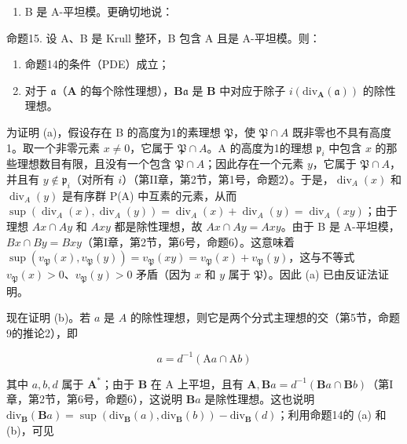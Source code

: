 \begin{enumerate}
\def\labelenumi{(\arabic{enumi})}
\setcounter{enumi}{1}
\tightlist
\item
  B 是 A-平坦模。更确切地说：
\end{enumerate}

命题15. 设 A、B 是 Krull 整环，B 包含 A 且是 A-平坦模。则：

\begin{enumerate}
\def\labelenumi{(\alph{enumi})}
\item
  命题14的条件（PDE）成立；
\item
  对于 \(\mathfrak{a}\)（\(\mathbf{A}\) 的每个除性理想），\(\mathbf{B}\mathfrak{a}\) 是 \(\mathbf{B}\) 中对应于除子 \(i(\mathrm{div}_{\mathbf{A}}(\mathfrak{a}))\) 的除性理想。
\end{enumerate}

为证明 (a)，假设存在 B 的高度为1的素理想 \(\mathfrak{P}\)，使 \(\mathfrak{P} \cap A\) 既非零也不具有高度1。取一个非零元素 \(x \neq 0\)，它属于 \(\mathfrak{P} \cap A\)。A 的高度为1的理想 \(\mathfrak{p}_i\) 中包含 \(x\) 的那些理想数目有限，且没有一个包含 \(\mathfrak{P} \cap A\)；因此存在一个元素 \(y\)，它属于 \(\mathfrak{P} \cap A\)，并且有 \(y \notin \mathfrak{p}_i\)（对所有 \(i\)）（第II章，第2节，第1号，命题2）。于是，\(\operatorname{div}_{A}(x)\) 和 \(\operatorname{div}_{A}(y)\) 是有序群 P(A) 中互素的元素，从而 \(\sup (\operatorname{div}_{A}(x), \operatorname{div}_{A}(y)) = \operatorname{div}_{A}(x) + \operatorname{div}_{A}(y) = \operatorname{div}_{A}(xy)\)；由于理想 \(Ax \cap Ay\) 和 \(Axy\) 都是除性理想，故 \(Ax \cap Ay = Axy\)。由于 B 是 A-平坦模，\(Bx \cap By = Bxy\)（第I章，第2节，第6号，命题6）。这意味着 \(\sup (v_{\mathfrak{P}}(x), v_{\mathfrak{P}}(y)) = v_{\mathfrak{P}}(xy) = v_{\mathfrak{P}}(x) + v_{\mathfrak{P}}(y)\)，这与不等式 \(v_{\mathfrak{P}}(x) > 0\)、\(v_{\mathfrak{P}}(y) > 0\) 矛盾（因为 \(x\) 和 \(y\) 属于 \(\mathfrak{P}\)）。因此 (a) 已由反证法证明。

现在证明 (b)。若 \(a\) 是 \(A\) 的除性理想，则它是两个分式主理想的交（第5节，命题9的推论2），即

\[
a = d ^ {- 1} (\mathrm{A} a \cap \mathrm{A} b)
\]

其中 \(a, b, d\) 属于 \(\mathbf{A}^*\)；由于 \(\mathbf{B}\) 在 A 上平坦，且有 \(\mathbf{A}, \mathbf{B}a = d^{-1}(\mathbf{B}a \cap \mathbf{B}b)\)（第I章，第2节，第6号，命题6），这说明 \(\mathbf{B}a\) 是除性理想。这也说明 \(\mathrm{div}_{\mathbf{B}}(\mathbf{B}a) = \sup (\mathrm{div}_{\mathbf{B}}(a), \mathrm{div}_{\mathbf{B}}(b)) - \mathrm{div}_{\mathbf{B}}(d)\)；利用命题14的 (a) 和 (b)，可见


